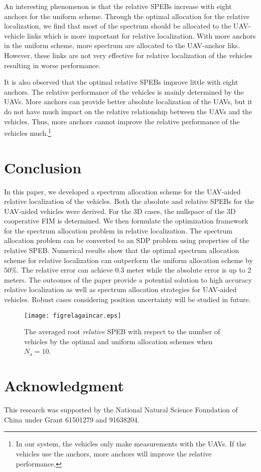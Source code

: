 \documentclass{IEEEtran}
\begin{document}
An interesting phenomenon is that the relative SPEBs increase with eight anchors for the uniform scheme. Through the optimal allocation for the relative localization, we find that most of the spectrum should be allocated to the UAV-vehicle links which is more important for relative localization. With more anchors in the uniform scheme, more spectrum are allocated to the UAV-anchor liks. However, these links are not very effective for relative localization of the vehicles resulting in worse performance.

It is also observed that the optimal relative SPEBs improve little with eight anchors. The relative performance of the vehicles is mainly determined by the UAVs. More anchors can provide better absolute localization of the UAVs, but it do not have much impact on the relative relationship between the UAVs and the vehicles. Thus, more anchors cannot improve the relative performance of the vehicles much.\footnote{In our system, the vehicles only make measurements with the UAVs. If the vehicles use the anchors, more anchors will improve the relative performance.}

\section{Conclusion}
In this paper, we developed a spectrum allocation scheme for the UAV-aided relative localization of the vehicles. Both the absolute and relative SPEBs for the UAV-aided vehicles were derived. For the 3D cases, the nullspace of the 3D cooperative FIM is determined. We then formulate the optimization framework for the spectrum allocation problem in relative localization. The spectrum allocation problem can be converted to an SDP problem using properties of the relative SPEB. Numerical results show that the optimal spectrum allocation scheme for relative localization can outperform the uniform allocation scheme by $50\%$. The relative error can achieve 0.3 meter while the absolute error is up to 2 meters. The outcomes of the paper provide a potential solution to high accuracy relative localization as well as spectrum allocation strategies for UAV-aided vehicles. Robust cases considering position uncertainty will be studied in future.
\begin{figure}[t]
    \centering
    \texttt{[image: figrelagaincar.eps]}
    \caption{The averaged root \emph{relative} SPEB with respect to the number of vehicles by the optimal and uniform allocation schemes when $N_{\text{a}}=10$.}\label{Fig4}
\end{figure}
\section*{Acknowledgment}
This research was supported by the National Natural Science Foundation of China under Grant 61501279 and 91638204.






\end{document}
